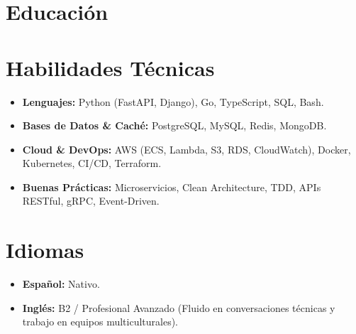 \documentclass[11pt,a4paper,sans]{moderncv}
\begin{document}
\section{Educación}

\section{Habilidades Técnicas}
\begin{itemize}
    \item \textbf{Lenguajes:} Python (FastAPI, Django), Go, TypeScript, SQL, Bash.
    \item \textbf{Bases de Datos \& Caché:} PostgreSQL, MySQL, Redis, MongoDB.
    \item \textbf{Cloud \& DevOps:} AWS (ECS, Lambda, S3, RDS, CloudWatch), Docker, Kubernetes, CI/CD, Terraform.
    \item \textbf{Buenas Prácticas:} Microservicios, Clean Architecture, TDD, APIs RESTful, gRPC, Event-Driven.
\end{itemize}

\section{Idiomas}
\begin{itemize}
    \item \textbf{Español:} Nativo.
    \item \textbf{Inglés:} B2 / Profesional Avanzado (Fluido en conversaciones técnicas y trabajo en equipos multiculturales).
\end{itemize}
\end{document}
